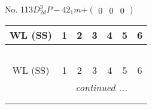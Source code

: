 \documentclass[fleqn,9pt,landscape]{jsarticle}
\begin{document}
\newpage
No. 113\quad$D_{2d}^{3}$\quad$P-42_1m$\quad[ tetragonal ]\quad$+\begin{pmatrix} 0 & 0 & 0 \end{pmatrix}$
\begin{center}
\renewcommand{\arraystretch}{1.2}
\begin{longtable}{ccccccc}
 \hline \hline
WL (SS) & 1 & 2 & 3 & 4 & 5 & 6 \\ \hline \endfirsthead

\multicolumn{6}{l}{\tablename\ \thetable{}} \\
 \hline \hline
WL (SS) & 1 & 2 & 3 & 4 & 5 & 6 \\ \hline \endhead

 \hline \hline
\multicolumn{6}{r}{\footnotesize\it continued ...} \\ \endfoot

 \hline \hline
\multicolumn{6}{r}{} \\ \endlastfoot


\end{longtable}
\end{center}
\end{document}

